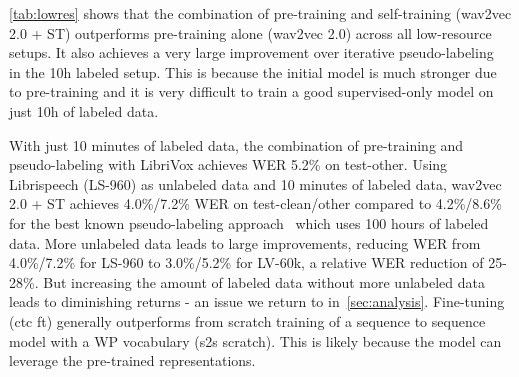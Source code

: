 \documentclass{article}
\newcommand{\wvpp}{wav2vec 2.0}
\newcommand{\vox}{LibriVox}
\newcommand{\libri}{Librispeech}
\newcommand{\voxsz}{LV-60k}
\newcommand{\librisz}{LS-960}
\begin{document}
\autoref{tab:lowres} shows that the combination of pre-training and self-training (\wvpp{} + ST) outperforms pre-training alone (\wvpp{}) across all low-resource setups.
It also achieves a very large improvement over iterative pseudo-labeling~\cite{xu2020iterative} in the 10h labeled setup. 
This is because the initial model is much stronger due to pre-training and it is very difficult to train a good supervised-only model on just 10h of labeled data.

With just 10 minutes of labeled data, the combination of pre-training and pseudo-labeling with \vox{} achieves WER 5.2\% on test-other.
Using \libri{} (\librisz{}) as unlabeled data and 10 minutes of labeled data, \wvpp{} + ST  achieves 4.0\%/7.2\% WER on test-clean/other compared to 4.2\%/8.6\% for the best known pseudo-labeling approach~\cite{park2020improved} which uses 100 hours of labeled data.
More unlabeled data leads to large improvements, reducing WER from 4.0\%/7.2\% for \librisz{} to 3.0\%/5.2\% for \voxsz{}, a relative WER reduction of 25-28\%.
But increasing the amount of labeled data without more unlabeled data leads to diminishing returns - an issue we return to in~\autoref{sec:analysis}.
Fine-tuning (ctc ft) generally outperforms from scratch training of a sequence to sequence model with a WP vocabulary (s2s scratch).
This is likely because the model can leverage the pre-trained representations.
\end{document}
